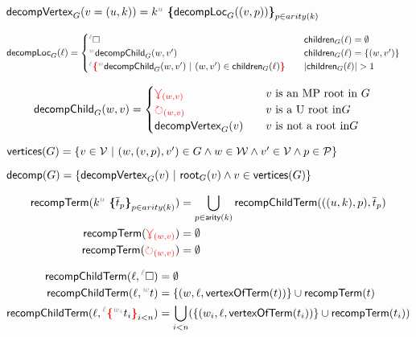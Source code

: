     $\mathsf{decompVertex}_{G}(v = (u,k)) = \genericTerm{u}{\mathsf{decompLoc}_{G}((v,p))}$



\begin{align*}
    \mathsf{decompLoc}_{G}(\ell) &= \begin{cases}
        \ehole &\quad \mathsf{children}_{G}(\ell) = \emptyset \\ \eid{w}{}{\mathsf{decompChild}_G(w, v')} &\quad \mathsf{children}_{G}(\ell) = \SetOf{(w,v')}\\ \conflictHoleTerm{\ell}{\eid{w}{}{\mathsf{decompChild}_G(w, v')} \SuchThat{(w,v') \in \mathsf{children}_{G}(\ell)}} &\quad \abs{\mathsf{children}_{G}(\ell)} > 1 \\
    \end{cases}
\end{align*}



\begin{align*}
    \mathsf{decompChild}_G(w, v)  &= \begin{cases}
        \textcolor{red}{\curlyveedownarrow_{(w,v)}}  &\quad v\text{ is an MP root in } G\\
        \textcolor{red}{\circlearrowright_{(w,v)}}  &\quad v\text{ is a U root in} G\\
        \mathsf{decompVertex}_{G}(v) &\quad v\text{ is not a root in} G
    \end{cases} 
\end{align*}



    $\mathsf{vertices}(G) = \left\{v \in \mathcal{V} ~\vert~(w, (v,p), v') \in G \land w \in \mathcal{W} \land v' \in \mathcal{V} \land p \in \mathcal{P}\right\}$



    $\mathsf{decomp}(G) = \left\{\mathsf{decompVertex}_{G}(v) ~\vert~\mathsf{root}_G(v) \land v \in \mathsf{vertices}(G)\right\}$



    \begin{align*}
        \mathsf{recompTerm}(\genericTerm{u}{\subtermMV_p}) &= \bigcup_{p\in \mathsf{arity}(k)}\mathsf{recompChildTerm}(((u,k),p), \subtermMV_p)\\
        \mathsf{recompTerm}(\multiref) &= \emptyset\\
        \mathsf{recompTerm}(\uniref) &= \emptyset
    \end{align*}



    \begin{align*}
    \mathsf{recompChildTerm}(\ell, \ehole) &= \emptyset\\
    \mathsf{recompChildTerm}(\ell, \eid{w}{}\termMV) &= \SetOf{(w, \ell, \mathsf{vertexOfTerm}(\termMV))}\cup \mathsf{recompTerm}(t)\\
    \mathsf{recompChildTerm}(\ell, \conflictHoleTerm{\ell}{\eid{w_i}{}\termMV_i}_{i<n}) &= \bigcup_{i<n} (\SetOf{(w_i, \ell, \mathsf{vertexOfTerm}(\termMV_i))}\cup \mathsf{recompTerm}(t_i))
    \end{align*}
    


